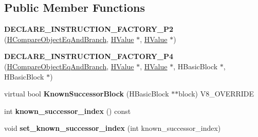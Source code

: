 \subsection*{Public Member Functions}
\begin{DoxyCompactItemize}
\item 
\hypertarget{classv8_1_1internal_1_1_h_compare_object_eq_and_branch_aafed8dc44aec043a56bfbaae2db77e28}{}{\bfseries D\+E\+C\+L\+A\+R\+E\+\_\+\+I\+N\+S\+T\+R\+U\+C\+T\+I\+O\+N\+\_\+\+F\+A\+C\+T\+O\+R\+Y\+\_\+\+P2} (\hyperlink{classv8_1_1internal_1_1_h_compare_object_eq_and_branch}{H\+Compare\+Object\+Eq\+And\+Branch}, \hyperlink{classv8_1_1internal_1_1_h_value}{H\+Value} $\ast$, \hyperlink{classv8_1_1internal_1_1_h_value}{H\+Value} $\ast$)\label{classv8_1_1internal_1_1_h_compare_object_eq_and_branch_aafed8dc44aec043a56bfbaae2db77e28}

\item 
\hypertarget{classv8_1_1internal_1_1_h_compare_object_eq_and_branch_aaaab7f37bc8fe74d5ef61aba11b9099a}{}{\bfseries D\+E\+C\+L\+A\+R\+E\+\_\+\+I\+N\+S\+T\+R\+U\+C\+T\+I\+O\+N\+\_\+\+F\+A\+C\+T\+O\+R\+Y\+\_\+\+P4} (\hyperlink{classv8_1_1internal_1_1_h_compare_object_eq_and_branch}{H\+Compare\+Object\+Eq\+And\+Branch}, \hyperlink{classv8_1_1internal_1_1_h_value}{H\+Value} $\ast$, \hyperlink{classv8_1_1internal_1_1_h_value}{H\+Value} $\ast$, H\+Basic\+Block $\ast$, H\+Basic\+Block $\ast$)\label{classv8_1_1internal_1_1_h_compare_object_eq_and_branch_aaaab7f37bc8fe74d5ef61aba11b9099a}

\item 
\hypertarget{classv8_1_1internal_1_1_h_compare_object_eq_and_branch_a3e2f9e31e114601477582649e360c9b1}{}virtual bool {\bfseries Known\+Successor\+Block} (H\+Basic\+Block $\ast$$\ast$block) V8\+\_\+\+O\+V\+E\+R\+R\+I\+D\+E\label{classv8_1_1internal_1_1_h_compare_object_eq_and_branch_a3e2f9e31e114601477582649e360c9b1}

\item 
\hypertarget{classv8_1_1internal_1_1_h_compare_object_eq_and_branch_a116a09d3c3b51e058a7be77ee5067581}{}int {\bfseries known\+\_\+successor\+\_\+index} () const \label{classv8_1_1internal_1_1_h_compare_object_eq_and_branch_a116a09d3c3b51e058a7be77ee5067581}

\item 
\hypertarget{classv8_1_1internal_1_1_h_compare_object_eq_and_branch_a106d8525f647a497c940a25225712d1b}{}void {\bfseries set\+\_\+known\+\_\+successor\+\_\+index} (int known\+\_\+successor\+\_\+index)\label{classv8_1_1internal_1_1_h_compare_object_eq_and_branch_a106d8525f647a497c940a25225712d1b}


\end{DoxyCompactItemize}
